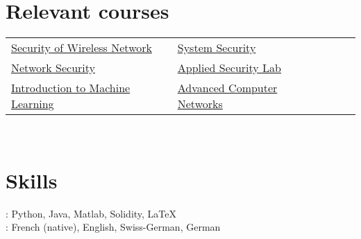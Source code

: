 \documentclass[mm, 11pt]{simple_style}
\begin{document}
\begin{resume}
\section{Relevant courses}
    \begin{tabular}{lllll}
        \href{http://www.syssec.ethz.ch/education/sown/sown_AS16.html}{Security of Wireless Network} & \href{http://www.syssec.ethz.ch/education/system_security/system_security_as16.html}{System Security}\\
        \href{https://netsec.ethz.ch/courses/netsec-2016/}{Network Security} & \href{http://www.infsec.ethz.ch/education/as2016.html}{Applied Security Lab} \\
        \href{https://www.cs.cmu.edu/~10601b/}{Introduction to Machine Learning} & \href{https://ndal.ethz.ch/courses/acn.html}{Advanced Computer Networks}\\
    \end{tabular}\\
\sectionline
\section{Skills}
: Python, Java, Matlab, Solidity, \LaTeX\\
: French (native), English, Swiss-German, German\\
\sectionline

\end{resume}
\end{document}
